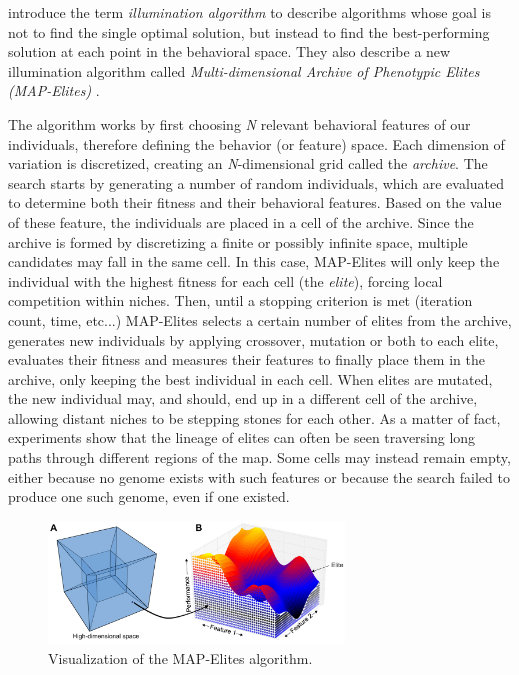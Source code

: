 \documentclass{Configuration_Files/PoliMi3i_thesis}
\begin{document}
 introduce the term \textit{illumination algorithm} to describe algorithms whose goal is not to find the single optimal solution, but instead to find the best-performing solution at each point in the behavioral space. They also describe a new illumination algorithm called \textit{Multi-dimensional Archive of Phenotypic Elites (MAP-Elites)} \cite{mouret_illuminating_2015}. 

The algorithm works by first choosing \textit{N} relevant behavioral features of our individuals, therefore defining the behavior (or feature) space. Each dimension of variation is discretized, creating an \textit{N}-dimensional grid called the \textit{archive}. The search starts by generating a number of random individuals, which are evaluated to determine both their fitness and their behavioral features. Based on the value of these feature, the individuals are placed in a cell of the archive. Since the archive is formed by discretizing a finite or possibly infinite space, multiple candidates may fall in the same cell. In this case, MAP-Elites will only keep the individual with the highest fitness for each cell (the \textit{elite}), forcing local competition within niches. Then, until a stopping criterion is met (iteration count, time, etc...) MAP-Elites selects a certain number of elites from the archive, generates new individuals by applying crossover, mutation or both to each elite, evaluates their fitness and measures their features to finally place them in the archive, only keeping the best individual in each cell. When elites are mutated, the new individual may, and should, end up in a different cell of the archive, allowing distant niches to be stepping stones for each other. As a matter of fact, experiments show that the lineage of elites can often be seen traversing long paths through different regions of the map. Some cells may instead remain empty, either because no genome exists with such features or because the search failed to produce one such genome, even if one existed. \cite{mouret_illuminating_2015}

\begin{figure}[H]
    \centering
    \includegraphics[width=0.7\textwidth]{Images/MAPElites.png}
    \caption{Visualization of the MAP-Elites algorithm.}
    \label{fig:mapelites}
\end{figure}
\end{document}
